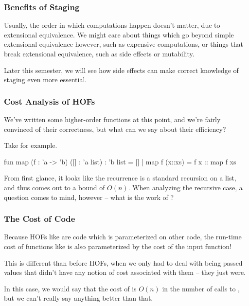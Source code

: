 \documentclass[aspectratio=169]{beamer}
\begin{document}
\begin{frame}[fragile]
  \frametitle{Benefits of Staging}

  Usually, the order in which computations happen doesn't matter, due to extensional
  equivalence. We might care about things which go beyond simple extensional equivalence
  however, such as expensive computations, or things that break extensional equivalence,
  such as side effects or mutability.

  \pause
  \vspace{\fill}
  
  Later this semester, we will see how side effects can make correct knowledge of staging
  even more essential.
\end{frame}


\begin{frame}[fragile]
  \frametitle{Cost Analysis of HOFs}

  We've written some higher-order functions at this point, and we're fairly convinced
  of their correctness, but what can we say about their efficiency?

  \pause
  \vspace{\fill}

  Take  for example.

  \pause
  \vspace{\fill}

  \begin{codeblock}
    fun map (f : 'a -> 'b) ([] : 'a list) : 'b list = []
      | map f (x::xs) = f x :: map f xs
  \end{codeblock}

  \pause
  \vspace{\fill}

  From first glance, it looks like the recurrence is a standard recursion on a list,
  and thus comes out to a bound of $O(n)$. When analyzing the recursive case, a question
  comes to mind, however -- what is the work of ?
\end{frame}

\begin{frame}[fragile]
  \frametitle{The Cost of Code}

  \ptmt 

  Because HOFs like  are code which is parameterized on other code, 
  the run-time cost of functions like  is also parameterized by 
  the cost of the input function!

  \pause
  \vspace{\fill}
  
  This is different than before HOFs, when we only had to deal with being passed
  values that didn't have any notion of cost associated with them -- they just were.

  \pause
  \vspace{\fill}

  In this case, we would say that the cost of  is $O(n)$ in the number of
  calls to , but we can't really say anything better than that.
\end{frame}
\end{document}
